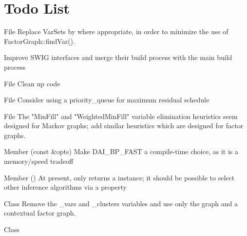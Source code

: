 \chapter{Todo List}
\hypertarget{todo}{}\label{todo}

\begin{DoxyRefList}
\item[File \doxylink{alldai_8h}{alldai.h} ]\label{todo__todo000002}%
%
Replace Var\+Sets by  where appropriate, in order to minimize the use of Factor\+Graph\+::find\+Var().

\label{todo__todo000003}%
%
Improve SWIG interfaces and merge their build process with the main build process  
\item[File \doxylink{bbp_8h}{bbp.h} ]\label{todo__todo000004}%
%
Clean up code  
\item[File \doxylink{bp_8h}{bp.h} ]\label{todo__todo000005}%
%
Consider using a priority\+\_\+queue for maximum residual schedule  
\item[File \doxylink{clustergraph_8h}{clustergraph.h} ]\label{todo__todo000007}%
%
The "{}\+Min\+Fill"{} and "{}\+Weighted\+Min\+Fill"{} variable elimination heuristics seem designed for Markov graphs; add similar heuristics which are designed for factor graphs.  
\item[Member \doxylink{classdai_1_1BP_a6a169aace3fd0538e79cef8392cfe2a4}{dai\+::BP\+::set\+Properties} (const \doxylink{classdai_1_1PropertySet}{Property\+Set} \&opts)]\label{todo__todo000001}%
%
Make DAI\+\_\+\+BP\+\_\+\+FAST a compile-\/time choice, as it is a memory/speed tradeoff  
\item[Member \doxylink{classdai_1_1CBP_aac74216a45f7a86c97b8005b11686307}{dai\+::CBP\+::get\+Inf\+Alg} ()]\label{todo__todo000006}%
%
At present,  only returns a  instance; it should be possible to select other inference algorithms via a property  
\item[Class \doxylink{classdai_1_1ClusterGraph}{dai\+::Cluster\+Graph} ]\label{todo__todo000008}%
%
Remove the \+\_\+vars and \+\_\+clusters variables and use only the graph and a contextual factor graph.  
\item[Class \doxylink{classdai_1_1CobwebGraph}{dai\+::Cobweb\+Graph} ]\label{todo__todo000009}%

\end{DoxyRefList}
